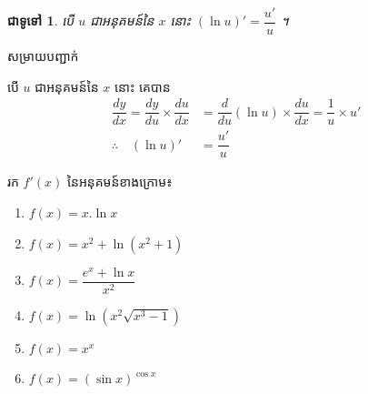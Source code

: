 \documentclass[12pt,fleqn]{book} %
\newtheorem{general}{\kml ជាទូទៅ}
\newcommand{\solution}{{\begin{center}\kml \color{blue} សម្រាយបញ្ជាក់\end{center} }}
\begin{document}
\begin{general}
បើ $u$ ជាអនុគមន៍នៃ $x$ នោះ $(\ln u)'=\dfrac{u'}{u}$ ។ 
\end{general}
\solution 
បើ $u$ ជាអនុគមន៍នៃ $x$ នោះ  គេបាន 
\begin{align*}
\dfrac{dy}{dx}=\dfrac{dy}{du}\times \dfrac{du}{dx}&=\dfrac{d}{du}(\ln u)\times \dfrac{du}{dx}=\dfrac{1}{u}\times u'\\
\therefore \quad (\ln u)'&=\dfrac{u'}{u}
\end{align*}
\begin{example}
រក $f'(x)$ នៃអនុគមន៍ខាងក្រោម៖
\begin{multicols}{2}
\begin{enumerate}
\item $f(x)=x.\ln x$
\item $f(x)=x^2+\ln (x^2+1)$
\item $f(x)=\dfrac{e^x+\ln x}{x^2}$
\item $f(x)=\ln (x^2 \sqrt{x^3-1})$
\item $f(x)=x^x$
\item $f(x)=(\sin x)^{\cos x}$
\end{enumerate}
\end{multicols}
\end{example}
\end{document}
